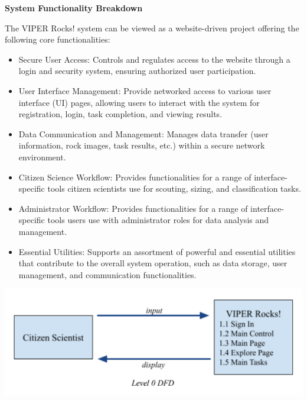 \documentclass{article}
\begin{document}
\textbf{System Functionality Breakdown}

The VIPER Rocks! system can be viewed as a website-driven project offering the following core functionalities:
\begin{itemize}
	\item Secure User Access: Controls and regulates access to the website through a login and security system, ensuring authorized user participation.
	\item User Interface Management: Provide networked access to various user interface (UI) pages, allowing users to interact with the system for registration, login, task completion, and viewing results.
	\item Data Communication and Management: Manages data transfer (user information, rock images, task results, etc.) within a secure network environment.
	\item Citizen Science Workflow: Provides functionalities for a range of interface-specific tools citizen scientists use for scouting, sizing, and classification tasks.
	\item Administrator Workflow: Provides functionalities for a range of interface-specific tools users use with administrator roles for data analysis and management.
	\item Essential Utilities: Supports an assortment of powerful and essential utilities that contribute to the overall system operation, such as data storage, user management, and communication functionalities.
\end{itemize}
\includegraphics{DFD_0}
\end{document}
